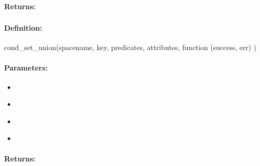 \paragraph{Returns:}


\pagebreak
\subsubsection{}
\label{api:nodejs:cond_set_union}


\paragraph{Definition:}
\begin{javascriptcode}
cond_set_union(spacename, key, predicates, attributes, function (success, err) {})
\end{javascriptcode}
\paragraph{Parameters:}
\begin{itemize}[noitemsep]
\item {}\\

\item {}\\

\item {}\\

\item {}\\

\end{itemize}

\paragraph{Returns:}


\pagebreak
\subsubsection{}
\label{api:nodejs:group_set_union}


